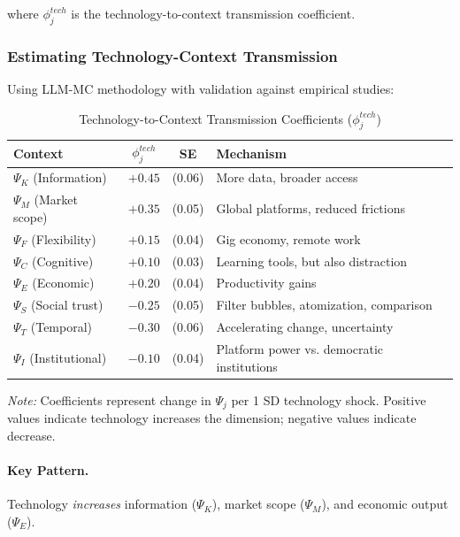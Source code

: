 where $\phi_j^{tech}$ is the technology-to-context transmission coefficient.

\subsubsection{Estimating Technology-Context Transmission}

Using LLM-MC methodology with validation against empirical studies:

\begin{table}[htbp]
\centering
\caption{Technology-to-Context Transmission Coefficients ($\phi_j^{tech}$)}
\label{tab:phi-tech}
\small
\begin{tabular}{@{}lccp{5cm}@{}}
\toprule
\textbf{Context} & \textbf{$\phi_j^{tech}$} & \textbf{SE} & \textbf{Mechanism} \\
\midrule
$\Psi_K$ (Information) & $+0.45$ & (0.06) & More data, broader access \\
$\Psi_M$ (Market scope) & $+0.35$ & (0.05) & Global platforms, reduced frictions \\
$\Psi_F$ (Flexibility) & $+0.15$ & (0.04) & Gig economy, remote work \\
$\Psi_C$ (Cognitive) & $+0.10$ & (0.03) & Learning tools, but also distraction \\
$\Psi_E$ (Economic) & $+0.20$ & (0.04) & Productivity gains \\
$\Psi_S$ (Social trust) & $-0.25$ & (0.05) & Filter bubbles, atomization, comparison \\
$\Psi_T$ (Temporal) & $-0.30$ & (0.06) & Accelerating change, uncertainty \\
$\Psi_I$ (Institutional) & $-0.10$ & (0.04) & Platform power vs. democratic institutions \\
\bottomrule
\end{tabular}
\begin{flushleft}
\small\textit{Note:} Coefficients represent change in $\Psi_j$ per 1 SD technology shock. 
Positive values indicate technology increases the dimension; negative values indicate decrease.
\end{flushleft}
\end{table}

\paragraph{Key Pattern.}
Technology \emph{increases} information ($\Psi_K$), market scope ($\Psi_M$), 
and economic output ($\Psi_E$).

